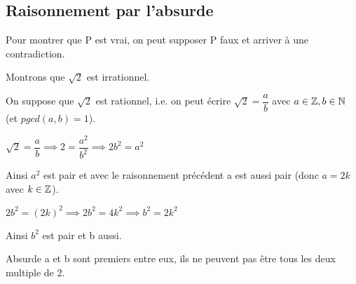 \documentclass[a4paper, 12pt]{article}
\begin{document}
\subsection{Raisonnement par l'absurde}

Pour montrer que P est vrai, on peut supposer P faux et arriver à une contradiction.

\begin{example}
    Montrons que $\sqrt{2}$ est irrationnel.

    \begin{demonstration*}
        On suppose que $\sqrt{2}$ est rationnel, i.e. on peut écrire $\sqrt{2} = \dfrac{a}{b}$ avec $a \in \mathbb{Z}, b \in \mathbb{N}$ (et $pgcd(a, b) = 1$).

        $\sqrt{2} = \dfrac{a}{b} \implies 2 = \dfrac{a^2}{b^2} \implies 2b^2 = a^2$

        Ainsi $a^2$ est pair et avec le raisonnement précédent a est aussi pair (donc $a = 2k$ avec $k \in \mathbb{Z}$).

        $2b^2 = (2k)^2 \implies 2b^2 = 4k^2 \implies b^2 = 2k^2$

        Ainsi $b^2$ est pair et b aussi.

        \begin{rdem}
            Absurde a et b sont premiers entre eux, ils ne peuvent pas être tous les deux multiple de 2.
        \end{rdem}
    \end{demonstration*}
\end{example}
\end{document}
